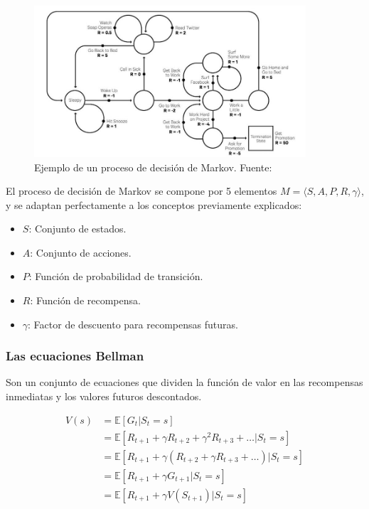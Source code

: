 \begin{figure}[h]
    \centering
    \includegraphics[width=0.9\textwidth]{cap2_contextualizacion/images/mdp.jpg}
    \caption{Ejemplo de un proceso de decisión de Markov. Fuente: \cite{randomantRL}}
    \label{fig:mdp}
\end{figure}

El proceso de decisión de Markov se compone por 5 elementos $M = \langle S, A, P, R, \gamma \rangle$, y se adaptan perfectamente a los conceptos previamente explicados:

\begin{itemize}
    \item $S$: Conjunto de estados.
    \item $A$: Conjunto de acciones.
    \item $P$: Función de probabilidad de transición.
    \item $R$: Función de recompensa.
    \item $\gamma$: Factor de descuento para recompensas futuras.
\end{itemize}

\subsubsection{Las ecuaciones Bellman}

Son un conjunto de ecuaciones que dividen la función de valor en las recompensas inmediatas y los valores futuros descontados. 

\begin{equation*}
\begin{split}
    V(s) & = \mathbb{E}[G_t|S_t = s]\\
    & = \mathbb{E}[R_{t+1} + \gamma R_{t+2} + \gamma^2 R_{t+3} + \ldots|S_t = s] \\
    & = \mathbb{E}[R_{t+1} + \gamma(R_{t+2} + \gamma R_{t+3} + \ldots)|S_t = s]\\
    & = \mathbb{E}[R_{t+1} + \gamma G_{t+1}|S_t = s]\\
    & = \mathbb{E}[R_{t+1} + \gamma V(S_{t+1})|S_t = s]
\end{split}
\end{equation*}

